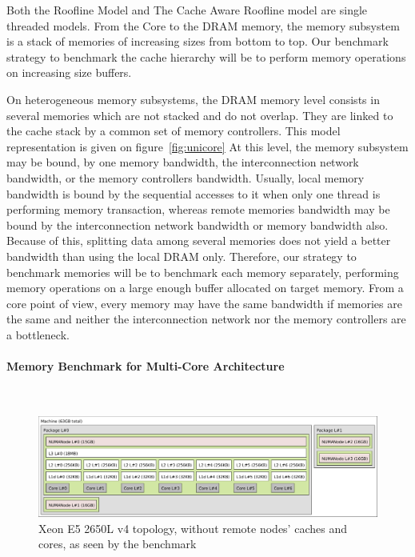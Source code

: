 \documentclass[twoside,twocolumn,8pt]{extarticle}
\begin{document}
Both the Roofline Model and The Cache Aware Roofline model are single threaded models.
From the Core to the DRAM memory, the memory subsystem is a stack of memories of increasing sizes from bottom to top.
Our benchmark strategy to benchmark the cache hierarchy will be to perform memory operations on increasing size buffers.

On heterogeneous memory subsystems, the DRAM memory level consists in several memories which are not stacked and do not
overlap. They are linked to the cache stack by a common set of memory controllers. This model representation is given on
figure~\ref{fig:unicore}
At this level, the memory subsystem may be bound, by one memory bandwidth, the interconnection network bandwidth,
or the memory controllers bandwidth.
Usually, local memory bandwidth is bound by the sequential accesses to it when only one thread is performing memory transaction,
whereas remote memories bandwidth may be bound by the interconnection network bandwidth or memory bandwidth also.
Because of this, splitting data among several memories does not yield a better bandwidth than using the local DRAM only.
Therefore, our strategy to benchmark memories will be to benchmark each memory separately, performing memory operations on a large
enough buffer allocated on target memory.
From a core point of view, every memory may have the same bandwidth if memories are the same and neither the interconnection
network nor the memory controllers are a bottleneck.

\paragraph{Memory Benchmark for Multi-Core Architecture}\mbox{}\\

\begin{figure}
  \centering
  \includegraphics[width=.9\textwidth]{pictures/Xeon_E5_2650L_v4}
  \caption{Xeon E5 2650L v4 topology, without remote nodes' caches and cores, as seen by the benchmark}
  \label{fig:joe0}
\end{figure}
\end{document}

